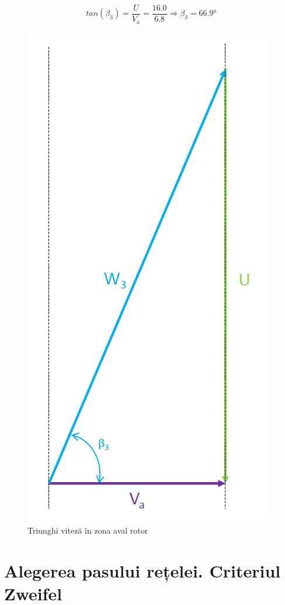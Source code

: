 \begin{equation}
tan(\beta_{3})=\frac{U}{V_a} = \frac{16.0}{6.8} \Rightarrow \beta_{3} =66.9\si{\degree}
\end{equation}

\begin{figure}[h]
	\centering
	\includegraphics[scale=0.4]{figures/triunghi_viteza_ZAR.jpg}
	\caption{Triunghi viteză în zona aval rotor}
	\label{Triunghi viteză în zona aval rotor}
\end{figure}

\clearpage

\section{Alegerea pasului rețelei. Criteriul Zweifel}

